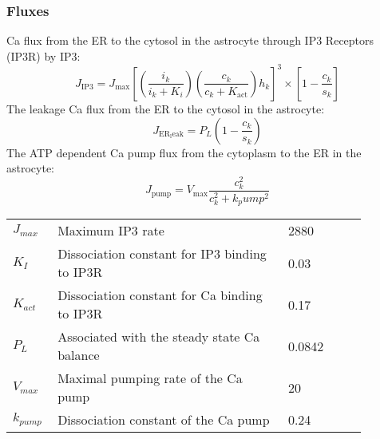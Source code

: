 \subsubsection{Fluxes}
\gls{Ca} flux from the ER to the cytosol in the astrocyte through \gls{IP3} Receptors (\gls{IP3}R) by \gls{IP3}: 
\begin{equation} \label{eqRN:J_ip3}
J_{\mathrm{IP3}}=J_{\mathrm{max}}[(\frac{i_k}{i_k+K_i})(\frac{c_k}{c_k+K_{\mathrm{act}}})h_k]^3\times [1-\frac{c_k}{s_k}] 
\end{equation}
%
The leakage \gls{Ca}  flux from the \gls{ER} to the cytosol in the astrocyte:
\begin{equation} \label{eqRN:J_ER_leak}
J_{\mathrm{ER_leak}} = P_L(1-\frac{c_k}{s_k})
\end{equation}	
%
The ATP dependent \gls{Ca}  pump flux from the cytoplasm to the ER in the astrocyte:
\begin{equation} \label{eqRN:J_pump}
J_{\mathrm{pump}} = V_{\mathrm{max}}\frac{c_k^2}{c_k^2+k_pump^2}
\end{equation}
\begin{table}[h!]
	\centering
	\begin{tabular}{| p{0.09\linewidth} | >{\footnotesize} p{0.6\linewidth} | >{\footnotesize} p{0.17\linewidth} | >{\footnotesize} p{0.02\linewidth} |}
		\arrayrulecolor{lightgrey}\hline	
		$J_{max}$       & Maximum \gls{IP3} rate                                                & 2880 \uMps        & \cite{Farr2011} \\  
		$K_I$           & Dissociation constant for \gls{IP3} binding to \gls{IP3}R             & 0.03 \uM          & \cite{Farr2011} \\ 
		$K_{act}$       & Dissociation constant for \gls{Ca} binding to \gls{IP3}R              & 0.17 \uM          & \cite{Farr2011} \\ 
		$P_L$           & Associated with the steady state \gls{Ca} balance                     & 0.0842 \uM           & \cite{LoesEvert} \\ 
		$V_{max}$       & Maximal pumping rate of the \gls{Ca} pump                             & 20 \uMps          & \cite{Farr2011} \\ 
		$k_{pump}$      & Dissociation constant of the \gls{Ca} pump                            & 0.24 \uM          & \cite{Farr2011} \\ 
		\hline
	\end{tabular}
\end{table}
